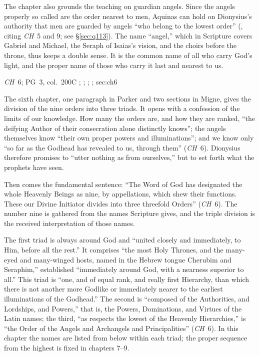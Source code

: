 The chapter also grounds the teaching on guardian angels. Since the
angels properly so called are the order nearest to men, Aquinas can hold
on Dionysius's authority that men are guarded by angels ``who belong to
the lowest order'' (, citing \emph{CH}~5 and 9;
see \S\ref{sec:q113}). The name ``angel,'' which in Scripture covers
Gabriel and Michael, the Seraph of Isaias's vision, and the choirs
before the throne, thus keeps a double sense. It is the common name of
all who carry God's light, and the proper name of those who carry it
last and nearest to us.

{\emph{CH}~6; PG~3, col.~200C}
{; ; ; ; }{sec:ch6}

The sixth chapter, one paragraph in Parker and two sections in Migne,
gives the division of the nine orders into three triads. It opens with
a confession of the limits of our knowledge. How many the orders are,
and how they are ranked, ``the deifying Author of their consecration
alone distinctly knows''; the angels themselves know ``their own proper
powers and illuminations''; and we know only ``so far as the Godhead has
revealed to us, through them'' (\emph{CH}~6). Dionysius therefore
promises to ``utter nothing as from ourselves,'' but to set forth what
the prophets have seen.

Then comes the fundamental sentence: ``The Word of God has designated
the whole Heavenly Beings as nine, by appellations, which shew their
functions. These our Divine Initiator divides into three threefold
Orders'' (\emph{CH}~6). The number nine is gathered from the names
Scripture gives, and the triple division is the received interpretation
of those names.

The first triad is always around God and ``united closely and
immediately, to Him, before all the rest.'' It comprises ``the most Holy
Thrones, and the many-eyed and many-winged hosts, named in the Hebrew
tongue Cherubim and Seraphim,'' established ``immediately around God,
with a nearness superior to all.'' This triad is ``one, and of equal
rank, and really first Hierarchy, than which there is not another more
Godlike or immediately nearer to the earliest illuminations of the
Godhead.'' The second is ``composed of the Authorities, and Lordships, and
Powers,'' that is, the Powers, Dominations, and Virtues of the Latin
names; the third, ``as respects the lowest of the Heavenly Hierarchies,''
is ``the Order of the Angels and Archangels and Principalities''
(\emph{CH}~6). In this chapter the names are listed from below within
each triad; the proper sequence from the highest is fixed in chapters
7--9.


